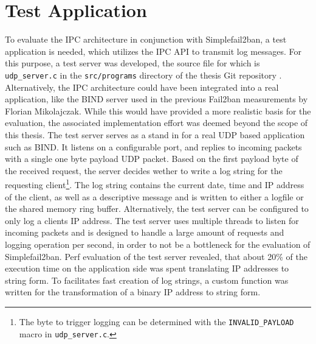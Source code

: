 \section{Test Application} \label{sec:test_server}

To evaluate the \ac{IPC} architecture in conjunction with Simplefail2ban, a test application is needed, which utilizes the \ac{IPC} API to transmit log
messages. For this purpose, a test server was developed, the source file for which is \texttt{udp\_server.c} in the \texttt{src/programs} directory of the thesis Git repository \cite{gitlab}. 
Alternatively, the \ac{IPC} architecture could have been integrated into a real application, like the BIND server used in the previous Fail2ban measurements by Florian Mikolajczak. While this would have provided a more 
realistic basis for the evaluation, the associated implementation effort was deemed beyond the scope of this thesis. 
The test server serves as a stand in for a real \ac{UDP} based application such as BIND. It listens on a configurable port,
and replies to incoming packets with a single one byte payload UDP packet. Based on the first payload byte of the received request,
the server decides wether to write a log string for the requesting client\footnote{The byte to trigger logging can be determined with the \texttt{INVALID\_PAYLOAD} macro in \texttt{udp\_server.c}.}.
The log string contains the current date, time and \ac{IP} address of the client, as well as a descriptive message and is written to either a logfile or the shared memory ring buffer.  
Alternatively, the test server can be configured to only log a clients \ac{IP} address. The test server uses multiple threads to listen for incoming packets 
and is designed to handle a large amount of requests and logging operation per second, in order to not be a bottleneck for the evaluation of Simplefail2ban. 
Perf \cite{perf} evaluation of the test server revealed, that about 20\% of the execution time on the application side was spent translating \ac{IP} addresses to string form.  
To facilitates fast creation of log strings, a custom function was written for the transformation of a binary \ac{IP} address to string form. 
